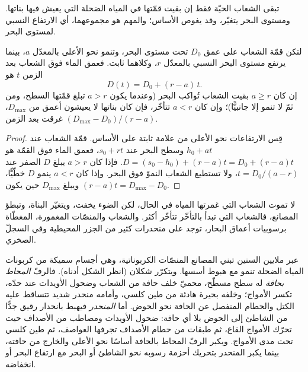 تبقى الشعاب الحيّة فقط إن بقيت قمّتها في المياه الضحلة التي يعيش فيها بناتها. ومستوى البحر يتغيّر، وقد يغوص الأساس؛ والمهم هو مجموعهما، أي الارتفاع النسبي لمستوى البحر.

\begin{proposition}\label{prop:b1:chemical-biogenic-sediments:keep-up}
لتكن قمّة الشعاب على عمق $D_0$ تحت مستوى البحر، وتنمو نحو الأعلى بالمعدّل $a$، بينما يرتفع مستوى البحر النسبي بالمعدّل $r$، وكلاهما ثابت. فعمق الماء فوق الشعاب بعد الزمن $t$ هو
\[
D(t) = D_0 + (r - a)\,t .
\]
إن كان $a \ge r$ بقيت الشعاب تُواكب البحر (وعندما يكون $a > r$ تبلغ قمّتها السطح، ومن ثمّ لا تنمو إلا جانبيًّا)؛ وإن كان $a < r$ تتأخّر، فإن كان بناتها لا يعيشون أعمق من $D_{\max}$، غرقت بعد الزمن $(D_{\max} - D_0)/(r - a)$.
\end{proposition}

\begin{proof}
قِس الارتفاعات نحو الأعلى من علامة ثابتة على الأساس. قمّة الشعاب عند $h_0 + a t$ وسطح البحر عند $s_0 + r t$، فعمق الماء فوق القمّة هو $D = (s_0 - h_0) + (r - a)t = D_0 + (r-a)t$. فإذا كان $a > r$ يبلغ $D$ الصفر عند $t = D_0/(a-r)$، ولا تستطيع الشعاب النموّ فوق البحر. وإذا كان $a < r$ ينمو $D$ خطّيًّا، ويبلغ $D_{\max}$ حين يكون $(r-a)t = D_{\max} -
D_0$.
\end{proof}

لا تموت الشعاب التي غمرتها المياه في الحال، لكن الضوء يخفت، ويتغيّر البناة، وتبطؤ المصانع، فالشعاب التي تبدأ بالتأخّر تتأخّر أكثر. والشعاب والمنصّات المغمورة، المغطّاة برسوبيات أعماق البحار، توجد على منحدرات كثير من الجزر المحيطية وفي السجلّ الصخري.

عبر ملايين السنين تبني المصانع المنصّات الكربوناتية، وهي أجسام سميكة من كربونات المياه الضحلة تنمو مع هبوط أسسها. ويتكرّر شكلان (انظر الشكل أدناه). فالرفّ \emph{المحاط بحافة} له سطح مسطّح، محميّ خلف حافة من الشعاب وضحول الأويدات عند حدّه، تكسر الأمواج؛ وخلفه بحيرة هادئة من طين كلسي، وأمامه منحدر شديد تتساقط عليه الكتل والحطام المنفصل عن الحافة نحو الحوض. أما \emph{المنحدر} فيهبط بانحدار رقيق جدًّا من الشاطئ إلى الحوض بلا أي حافة: ضحول الأويدات ومصاطب من الأصداف حيث تحرّك الأمواج القاع، ثم طبقات من حطام الأصداف تجرفها العواصف، ثم طين كلسي تحت مدى الأمواج. ويكبر الرفّ المحاط بالحافة أساسًا نحو الأعلى والخارج من حافته، بينما يكبر المنحدر بتحريك أحزمة رسوبه نحو الشاطئ أو البحر مع ارتفاع البحر أو انخفاضه.

